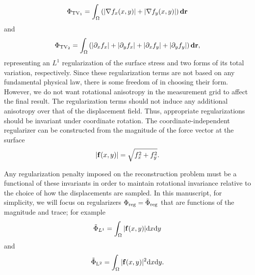\documentclass[aps,prl,reprint,twocolumn,groupedaddress,showpacs]{revtex4}
\newcommand{\bsigma}{{\boldsymbol\sigma}}
\def\d{{\bf d}}
\def\dd{\mbox{d}}
\def\f{{\bf f}}
\def\r{{\bf r}}
\begin{document}
\begin{equation}
 \Phi_{{\rm TV}_1} = \int_\Omega \left( \vert\nabla f_{x}(x,y) \vert +
 \vert\nabla f_{y}(x,y) \vert\right)\d\r
 \label{eq:PhiTV1}
\end{equation}
and
\begin{equation}
\Phi_{{\rm TV}_2} = \int_\Omega \left(\vert\partial_x f_{x}\vert 
+ \vert\partial_y f_{x}\vert + \vert\partial_x f_{y}\vert
+ \vert\partial_y f_{y}\vert\right)\d\r,
 \label{eq:PhiTV2}
\end{equation}
%
representing an $L^{1}$ regularization of the surface stress and two
forms of its total variation, respectively.  Since these
regularization terms are not based on any fundamental physical law,
there is some freedom of in choosing their form.  However, we do not
want rotational anisotropy in the measurement grid to affect the final
result. The regularization terms should not induce any additional
anisotropy over that of the displacement field.  Thus, appropriate
regularizations should be invariant under coordinate rotation. The
coordinate-independent regularizer can be 
constructed from the magnitude of the force vector at the surface
\begin{equation}
\vert\f(x,y) \vert  = \sqrt{f_{x}^{2} + f_{y}^{2}}.
\end{equation}



%
Any regularization penalty imposed on the reconstruction problem must
be a functional of these invariants in order to maintain rotational
invariance relative to the choice of how the displacements are
sampled.  In this manuscript, for simplicity, we will focus on
regularizers $\Phi_{\rm reg} = \tilde{\Phi}_{\rm reg}$ that are functions of the magnitude and
trace; for example
\begin{equation}
\tilde{\Phi}_{L^{1}} = \int_\Omega \vert\f(x,y) \vert \dd x\dd y
\label{eq:mag}
\end{equation}
and
%
\begin{equation}
\tilde{\Phi}_{\rm L^2} =  
 \int_\Omega \vert\f(x,y) \vert^2 \dd x\dd y.
\label{eq:PhiTVTr}
\end{equation}
\end{document}
